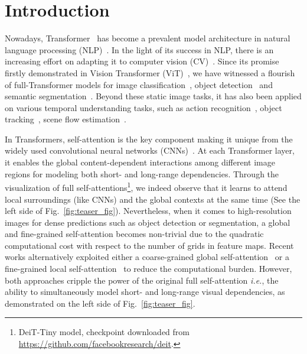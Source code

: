 \documentclass{article}
\begin{document}
\section{Introduction}
Nowadays, Transformer~\cite{vaswani2017attention} has become a prevalent model architecture in natural language processing (NLP)~\cite{devlin2019bert,brown2020language}. In the light of its success in NLP, there is an increasing effort on adapting it to computer vision (CV)~\cite{parmar2018image,ramachandran2019stand}. Since its promise firstly demonstrated in Vision Transformer (ViT)~\cite{dosovitskiy2020image}, we have witnessed a flourish of full-Transformer models for image classification~\cite{touvron2020training,wang2021pyramid,wu2021cvt,liu2021swin,zhang2021multi,vaswani2021scaling}, object detection~\cite{carion2020end,zhu2020deformable,zheng2020end,dai2020up} and semantic segmentation~\cite{wang2020max,wang2020end}. Beyond these static image tasks, it has also been applied on various temporal understanding tasks, such as action recognition~\cite{li2021trear,zhao2021tuber,chang2021augmented}, object tracking~\cite{chen2021Transformer,wang2021Transformer}, scene flow estimation~\cite{li2021sctn}. 


In Transformers, self-attention is the key component making it unique from the widely used convolutional neural networks (CNNs)~\cite{lecun1995convolutional}. At each Transformer layer, it enables the global content-dependent interactions among different image regions for modeling both short- and long-range dependencies. Through the visualization of full self-attentions\footnote{DeiT-Tiny model, checkpoint downloaded from \url{https://github.com/facebookresearch/deit}.}, we indeed observe that it learns to attend local surroundings (like CNNs) and the global contexts at the same time (See the left side of Fig.~\ref{fig:teaser_fig}). Nevertheless, when it comes to high-resolution images for dense predictions such as object detection or segmentation, a global and fine-grained self-attention becomes non-trivial due to the quadratic computational cost with respect to the number of grids in feature maps. 
Recent works alternatively exploited either a coarse-grained global self-attention~\cite{wang2021pyramid,wu2021cvt} or a fine-grained local self-attention~\cite{liu2021swin,zhang2021multi,vaswani2021scaling} to reduce the computational burden. However, both approaches  
cripple the power of the original full self-attention 
\textit{i.e.}, the ability to simultaneously model short- and long-range visual dependencies, as demonstrated on the left side of Fig.~\ref{fig:teaser_fig}.
\end{document}
